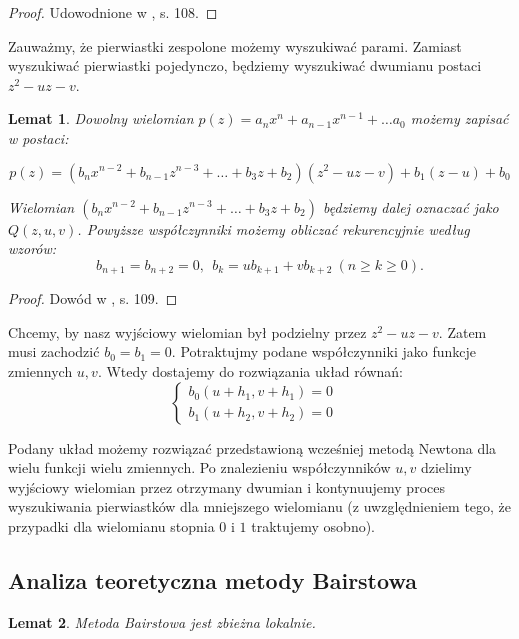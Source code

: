 \documentclass{article}
\newtheorem{lemat}{Lemat}
\begin{document}
\begin{proof}
Udowodnione w \cite{kincaid}, s. 108.	
\end{proof}

Zauważmy, że pierwiastki zespolone możemy wyszukiwać parami. Zamiast wyszukiwać pierwiastki pojedynczo, będziemy wyszukiwać dwumianu postaci $z^2 - uz - v$.

\begin{lemat}
Dowolny wielomian $p(z) = a_nx^n  + a_{n-1}x^{n-1} + \ldots a_0$ możemy zapisać w postaci: 

$$p(z) = \left(b_nx^{n-2} + b_{n-1}z^{n-3} + \ldots + b_3 z + b_2 \right) \left( z^2 - uz - v \right) + b_1(z-u) + b_0 $$	

Wielomian $ \left(b_nx^{n-2} + b_{n-1}z^{n-3} + \ldots + b_3 z + b_2 \right) $ będziemy dalej oznaczać jako $Q(z, u, v)$.
Powyższe współczynniki możemy obliczać rekurencyjnie według wzorów:
$$b_{n+1} = b_{n+2} = 0, \ \ b_k = ub_{k+1} + vb_{k+2} \ (n \geq k \geq 0).$$

\end{lemat}

\begin{proof}
Dowód w \cite{kincaid}, s. 109.	
\end{proof}

Chcemy, by nasz wyjściowy wielomian był podzielny przez $z^2 - uz - v$. Zatem musi zachodzić $b_0 = b_1 = 0$. Potraktujmy podane współczynniki jako funkcje zmiennych $u,v$. Wtedy dostajemy do rozwiązania układ równań:
$$
\left\{\begin{matrix}
b_0(u + h_1, v + h_1) = 0 & \\ 
b_1(u + h_2, v + h_2) = 0 & 
\end{matrix}\right.
$$

Podany układ możemy rozwiązać przedstawioną wcześniej metodą Newtona dla wielu funkcji wielu zmiennych. Po znalezieniu współczynników $u, v$ dzielimy wyjściowy wielomian przez otrzymany dwumian i kontynuujemy proces wyszukiwania pierwiastków dla mniejszego wielomianu (z uwzględnieniem tego, że przypadki dla wielomianu stopnia $0$ i $1$ traktujemy osobno).

\subsection{Analiza teoretyczna metody Bairstowa}

\begin{lemat}
Metoda Bairstowa jest zbieżna lokalnie.	
\end{lemat}
\end{document}
